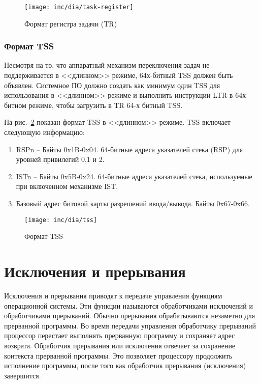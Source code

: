 \begin{figure}
  \centering
  \texttt{[image: inc/dia/task-register]}
  \caption{Формат регистра задачи (TR)}
  \label{fig:task_register}
\end{figure}

\subsubsection*{Формат TSS}
Несмотря на то, что аппаратный механизм переключения задач не поддерживается в
<<длинном>> режиме, 64х-битный TSS должен быть объявлен. Системное ПО должно
создать как минимум один TSS для использования в <<длинном>> режиме и
выполнить инструкции LTR в 64х-битном режиме, чтобы загрузить в TR 64-х битный
TSS.

На рис.~\ref{fig:tss} показан формат TSS в <<длинном>> режиме. TSS включает
следующую информацию:
\begin{enumerate}
\item RSPn -- Байты 0x1B-0x04. 64-битные адреса указателей стека (RSP) для
	уровней привилегий 0,1 и 2.
\item ISTn -- Байты 0x5B-0x24. 64-битные адреса указателей стека, используемые
	при включенном механизме IST.
\item Базовый адрес битовой карты разрешений ввода/вывода. Байты 0x67-0x66.
\end{enumerate}

\begin{figure}
  \centering
  \texttt{[image: inc/dia/tss]}
  \caption{Формат TSS}
  \label{fig:tss}
\end{figure}



\section{Исключения и прерывания}

Исключения и прерывания приводят к передаче управления функциям операционной
системы. Эти функции называются обработчиками исключений и обработчиками
прерываний. Обычно прерывания обрабатываются незаметно для прерванной
программы. Во время передачи управления обработчику прерываний процессор
перестает выполнять прерванную программу и сохраняет адрес возврата.
Обработчик прерывания или исключения отвечает за сохранение контекста
прерванной программы. Это позволяет процессору продолжить исполнение
программы, после того как обработчик прерывания (исключения) завершится.

